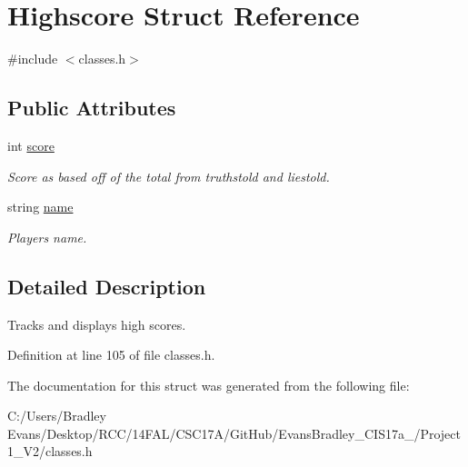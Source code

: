 \hypertarget{struct_highscore}{\section{Highscore Struct Reference}
\label{struct_highscore}
}


{\ttfamily \#include $<$classes.\+h$>$}

\subsection*{Public Attributes}
\begin{DoxyCompactItemize}
\item 
\hypertarget{struct_highscore_ac9dae3cd8bbd8b55fd4611203b10e082}{int \hyperlink{struct_highscore_ac9dae3cd8bbd8b55fd4611203b10e082}{score}}\label{struct_highscore_ac9dae3cd8bbd8b55fd4611203b10e082}

\begin{DoxyCompactList}\small\item\em Score as based off of the total from truthstold and liestold. \end{DoxyCompactList}\item 
\hypertarget{struct_highscore_a8213656e68dfb25b0a17519b5f62d5ec}{string \hyperlink{struct_highscore_a8213656e68dfb25b0a17519b5f62d5ec}{name}}\label{struct_highscore_a8213656e68dfb25b0a17519b5f62d5ec}

\begin{DoxyCompactList}\small\item\em Players name. \end{DoxyCompactList}\end{DoxyCompactItemize}


\subsection{Detailed Description}
Tracks and displays high scores. 

Definition at line 105 of file classes.\+h.



The documentation for this struct was generated from the following file\+:\begin{DoxyCompactItemize}
\item 
C\+:/\+Users/\+Bradley Evans/\+Desktop/\+R\+C\+C/14\+F\+A\+L/\+C\+S\+C17\+A/\+Git\+Hub/\+Evans\+Bradley\+\_\+\+C\+I\+S17a\+\_/\+Project 1\+\_\+\+V2/classes.\+h\end{DoxyCompactItemize}

